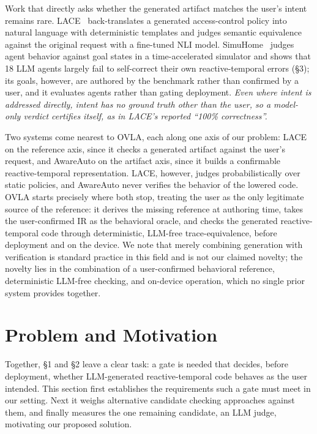 \documentclass[sigconf,nonacm,anonymous,review]{acmart}
\begin{document}
Work that directly asks whether the generated artifact matches the user's intent remains rare. LACE~\cite{lace} back-translates a generated access-control policy into natural language with deterministic templates and judges semantic equivalence against the original request with a fine-tuned NLI model. SimuHome~\cite{simuhome} judges agent behavior against goal states in a time-accelerated simulator and shows that 18 LLM agents largely fail to self-correct their own reactive-temporal errors (\S3); its goals, however, are authored by the benchmark rather than confirmed by a user, and it evaluates agents rather than gating deployment. \emph{Even where intent is addressed directly, intent has no ground truth other than the user, so a model-only verdict certifies itself, as in LACE's reported ``100\% correctness''.}

Two systems come nearest to OVLA, each along one axis of our problem: LACE on the reference axis, since it checks a generated artifact against the user's request, and AwareAuto on the artifact axis, since it builds a confirmable reactive-temporal representation. LACE, however, judges probabilistically over static policies, and AwareAuto never verifies the behavior of the lowered code. OVLA starts precisely where both stop, treating the user as the only legitimate source of the reference: it derives the missing reference at authoring time, takes the user-confirmed IR as the behavioral oracle, and checks the generated reactive-temporal code through deterministic, LLM-free trace-equivalence, before deployment and on the device. We note that merely combining generation with verification is standard practice in this field and is not our claimed novelty; the novelty lies in the combination of a user-confirmed behavioral reference, deterministic LLM-free checking, and on-device operation, which no single prior system provides together.

\section{Problem and Motivation}

Together, \S1 and \S2 leave a clear task: a gate is needed that decides, before deployment, whether LLM-generated reactive-temporal code behaves as the user intended. This section first establishes the requirements such a gate must meet in our setting. Next it weighs alternative candidate checking approaches against them, and finally measures the one remaining candidate, an LLM judge, motivating our proposed solution.
\end{document}
